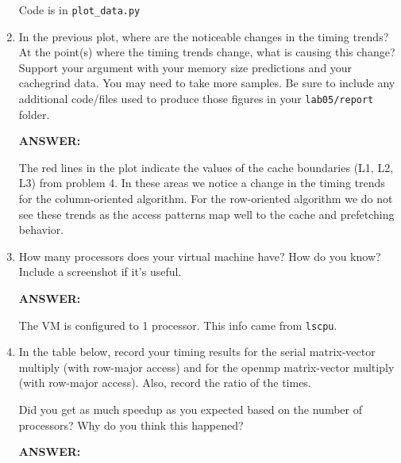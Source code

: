 \documentclass[letter]{article}
\begin{document}
\begin{enumerate}
        Code is in \texttt{plot\_data.py}

        \item In the previous plot, where are the noticeable changes in the timing trends?   At the point(s) where the timing trends change, what is causing this change?  Support your argument with your memory size predictions and your cachegrind data. You may need to take more samples.  Be sure to include any additional code/files used to produce those figures in your \texttt{lab05/report} folder.
        
        \textbf{ANSWER:} %
        
        The red lines in the plot indicate the values of the cache boundaries (L1, L2, L3) from problem 4.  In these areas we notice a change in the timing trends for the column-oriented algorithm.  For the row-oriented algorithm we do not see these trends as the access patterns map well to the cache and prefetching behavior.

        \item How many processors does your virtual machine have? How do you know? Include a screenshot if it's useful. 
        
        \textbf{ANSWER:} %

        The VM is configured to 1 processor.  This info came from \texttt{lscpu}.
       
        \item In the table below, record your timing results for the serial matrix-vector multiply (with row-major access) and for the openmp matrix-vector multiply (with row-major access).   Also, record the ratio of the times.

        Did you get as much speedup as you expected based on the number of processors? Why do you think this happened?
        
        \textbf{ANSWER:} %


\end{enumerate}
\end{document}
